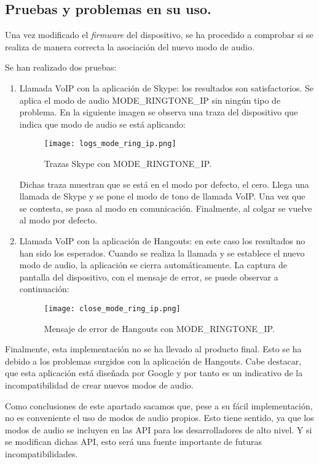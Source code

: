\subsection{Pruebas y problemas en su uso.}
Una vez modificado el \textit{firmware} del dispositivo, se ha procedido a comprobar si se realiza de manera correcta la asociación del nuevo modo de audio.

Se han realizado dos pruebas:
\begin{enumerate}
	\item Llamada \gls{VoIP} con la aplicación de Skype: los resultados son satisfactorios. Se aplica el modo de audio MODE\_RINGTONE\_IP sin ningún tipo de problema. En la siguiente imagen se observa una traza del dispositivo que indica que modo de audio se está aplicando:
	\begin{figure}[H]
		\centering
		\texttt{[image: logs\_mode\_ring\_ip.png]}
		\caption{Trazas Skype con MODE\_RINGTONE\_IP.}
		\label{fig:logs_mode_ring_ip}
	\end{figure}
	
	Dichas traza muestran que se está en el modo por defecto, el cero. Llega una llamada de Skype y se pone el modo de tono de llamada \gls{VoIP}. Una vez que se contesta, se pasa al modo en comunicación. Finalmente, al colgar se vuelve al modo por defecto.
	
	\item Llamada \gls{VoIP} con la aplicación de Hangouts: en este caso los resultados no han sido los esperados. Cuando se realiza la llamada y se establece el nuevo modo de audio, la aplicación se cierra automáticamente. La captura de pantalla del dispositivo, con el mensaje de error, se puede observar a continuación:
	\begin{figure}[H]
		\centering
		\texttt{[image: close\_mode\_ring\_ip.png]}
		\caption{Mensaje de error de Hangouts con MODE\_RINGTONE\_IP.}
		\label{fig:close_mode_ring_ip}
	\end{figure}
\end{enumerate}

Finalmente, esta implementación no se ha llevado al producto final. Esto se ha debido a los problemas surgidos con la aplicación de Hangouts. Cabe destacar, que esta aplicación está diseñada por Google y por tanto es un indicativo de la incompatibilidad de crear nuevos modos de audio.

Como conclusiones de este apartado sacamos que, pese a su fácil implementación, no es conveniente el uso de modos de audio propios. Esto tiene sentido, ya que los modos de audio se incluyen en las \gls{API} para los desarrolladores de alto nivel. Y si se modifican dichas \gls{API}, esto será una fuente importante de futuras incompatibilidades.

